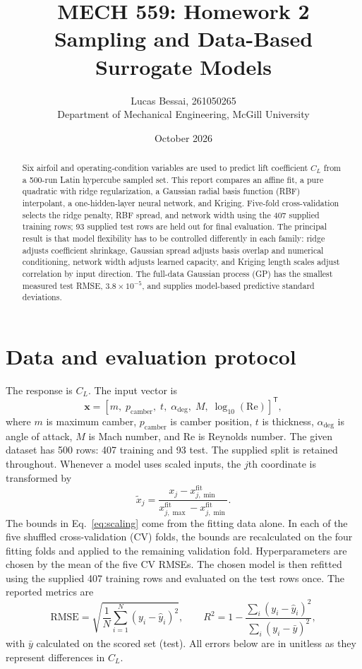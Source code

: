 \documentclass[11pt]{article}
\title{\textbf{MECH 559: Homework 2}\\Sampling and Data-Based Surrogate Models}
\author{Lucas Bessai, 261050265\\Department of Mechanical Engineering, McGill University}
\date{October 2026}
\begin{document}
\maketitle

\begin{abstract}
Six airfoil and operating-condition variables are used to predict lift coefficient $C_L$ from a 500-run Latin hypercube sampled set. This report compares an affine fit, a pure quadratic with ridge regularization, a Gaussian radial basis function (RBF) interpolant, a one-hidden-layer neural network, and Kriging. Five-fold cross-validation selects the ridge penalty, RBF spread, and network width using the 407 supplied training rows; 93 supplied test rows are held out for final evaluation. The principal result is that model flexibility has to be controlled differently in each family: ridge adjusts coefficient shrinkage, Gaussian spread adjusts basis overlap and numerical conditioning, network width adjusts learned capacity, and Kriging length scales adjust correlation by input direction. The full-data Gaussian process (GP) has the smallest measured test RMSE, $3.8\times10^{-5}$, and supplies model-based predictive standard deviations.
\end{abstract}

\tableofcontents

\section{Data and evaluation protocol}
The response is $C_L$. The input vector is
\begin{equation}
\mathbf{x}=\left[m,\;p_{\mathrm{camber}},\;t,\;\alpha_{\deg},\;M,\;\log_{10}(\mathrm{Re})\right]^{\mathsf T},
\end{equation}
where $m$ is maximum camber, $p_{\mathrm{camber}}$ is camber position, $t$ is thickness,  $\alpha_{\deg}$ is angle of attack, $M$ is Mach number, and $\mathrm{Re}$ is Reynolds number. The given dataset has 500 rows: 407 training and 93 test. The supplied split is retained throughout. Whenever a model uses scaled inputs, the $j$th coordinate is transformed by
\begin{equation}
\tilde x_j=\frac{x_j-x_{j,\min}^{\mathrm{fit}}}{x_{j,\max}^{\mathrm{fit}}-x_{j,\min}^{\mathrm{fit}}}.
\label{eq:scaling}
\end{equation}
The bounds in Eq.~\eqref{eq:scaling} come from the fitting data alone. In each of the five shuffled cross-validation (CV) folds, the bounds are recalculated on the four fitting folds and applied to the remaining validation fold. Hyperparameters are chosen by the mean of the five CV RMSEs. The chosen model is then refitted using the supplied 407 training rows and evaluated on the test rows once. The reported metrics are
\begin{equation}
\mathrm{RMSE}=\sqrt{\frac1N\sum_{i=1}^{N}(y_i-\hat y_i)^2},\qquad
R^2=1-\frac{\sum_i(y_i-\hat y_i)^2}{\sum_i(y_i-\bar y)^2},
\label{eq:metrics}
\end{equation}
with $\bar y$ calculated on the scored set (test). All errors below are in unitless as they represent differences in $C_L$.
\end{document}
